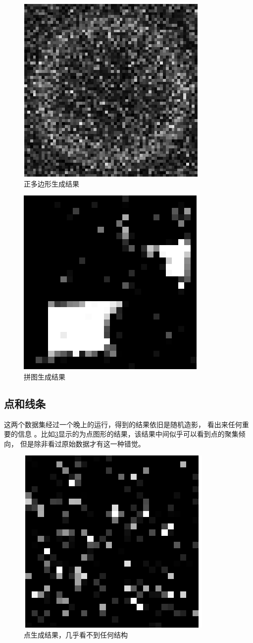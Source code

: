 \begin{figure}[!hbt]
    \centering
    \includegraphics[width=0.3\linewidth]{pic/polygon-res-b.png}
    \caption{正多边形生成结果}
    \label{polygon-res-b}
\end{figure}

\begin{figure}[!hbt]
    \centering
    \includegraphics[width=0.3\linewidth]{pic/tile-res-a.png}
    \caption{拼图生成结果}
    \label{tile-res-a}
\end{figure}


\subsection{点和线条}
这两个数据集经过一个晚上的运行，得到的结果依旧是随机造影， 看出来任何重要的信息
。比如\ref{star-res-a}显示的为点图形的结果，该结果中间似乎可以看到点的聚集倾
向， 但是除非看过原始数据才有这一种错觉。
\begin{figure}[!hbt]
    \centering
    \includegraphics[width=0.3\linewidth]{pic/star-res-a.png}
    \caption{点生成结果，几乎看不到任何结构}
    \label{star-res-a}
\end{figure}

